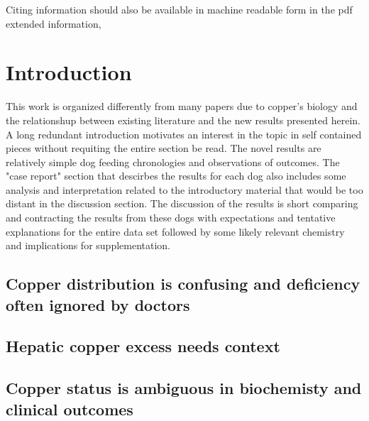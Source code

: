 \maketitle
\tableofcontents


\vspace{.5in}
Citing information should also be available in machine readable
form in the pdf extended information, 

\vspace{.3in}

\begin{minipage}{\linewidth}
%
%
\mjmshowbib
\end{minipage}


\newpage
\newcommand{\mjmguide}[1]{ \subsection{#1}}

\section{Introduction  }

This work is organized differently from many papers
due to copper's biology and the relationshup between existing
literature and the new results presented herein.
A long redundant introduction  motivates an interest in the topic
in self contained pieces without requiting the entire section  be read.
The novel results are relatively simple dog feeding chronologies
and observations of outcomes. The "case report" section that
descirbes the results for each dog also includes some analysis
and interpretation related to the   introductory material that would
be too distant in the discussion section. 
The discussion of the results is short  comparing and contracting the results
from these dogs with expectations and tentative explanations for
the entire data set  followed by some likely relevant chemistry and 
implications for supplementation.  

\mjmguide{ Copper distribution is confusing and deficiency often ignored by doctors}

\mjmintro


\mjmguide{ Hepatic copper excess needs context  }

\mjmmislead


\mjmguide{ Copper status is ambiguous in biochemisty and clinical outcomes   }

\mjmambig

